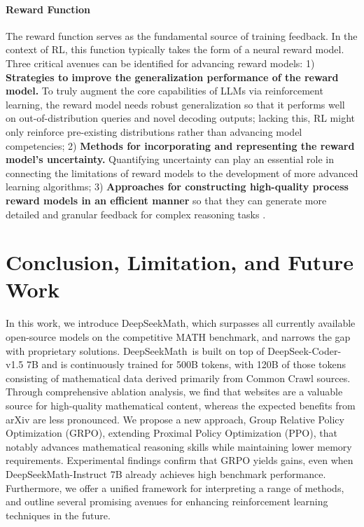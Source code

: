 \begin{itemize}[topsep=0pt]
\begin{itemize}[topsep=0pt]
\paragraph{Reward Function} The reward function serves as the fundamental source of training feedback. In the context of RL, this function typically takes the form of a neural reward model. Three critical avenues can be identified for advancing reward models: 1) \textbf{Strategies to improve the generalization performance of the reward model.} To truly augment the core capabilities of LLMs via reinforcement learning, the reward model needs robust generalization so that it performs well on out-of-distribution queries and novel decoding outputs; lacking this, RL might only reinforce pre-existing distributions rather than advancing model competencies; 2) \textbf{Methods for incorporating and representing the reward model’s uncertainty.} Quantifying uncertainty can play an essential role in connecting the limitations of reward models to the development of more advanced learning algorithms; 3) \textbf{Approaches for constructing high-quality process reward models in an efficient manner} so that they can generate more detailed and granular feedback for complex reasoning tasks \citep{lightman2023let,wang2023math}.

\section{Conclusion, Limitation, and Future Work} In this work, we introduce DeepSeekMath, which surpasses all currently available open-source models on the competitive MATH benchmark, and narrows the gap with proprietary solutions. DeepSeekMath~is built on top of DeepSeek-Coder-v1.5 7B and is continuously trained for 500B tokens, with 120B of those tokens consisting of mathematical data derived primarily from Common Crawl sources. Through comprehensive ablation analysis, we find that websites are a valuable source for high-quality mathematical content, whereas the expected benefits from arXiv are less pronounced. We propose a new approach, Group Relative Policy Optimization (GRPO), extending Proximal Policy Optimization (PPO), that notably advances mathematical reasoning skills while maintaining lower memory requirements. Experimental findings confirm that GRPO yields gains, even when DeepSeekMath-Instruct 7B already achieves high benchmark performance. Furthermore, we offer a unified framework for interpreting a range of methods, and outline several promising avenues for enhancing reinforcement learning techniques in the future.


\end{itemize}
\end{itemize}

